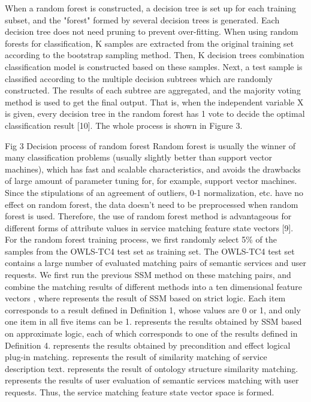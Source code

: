 \documentclass{ieeeaccess}
\begin{document}
When a random forest is constructed, a decision tree is set up for each training subset, and the "forest" formed by several decision trees is generated. Each decision tree does not need pruning to prevent over-fitting. When using random forests for classification, K samples are extracted from the original training set according to the bootstrap sampling method. Then, K decision trees combination classification model is constructed based on these samples. Next, a test sample is classified according to the multiple decision subtrees which are randomly constructed. The results of each subtree are aggregated, and the majority voting method is used to get the final output. That is, when the independent variable X is given, every decision tree in the random forest has 1 vote to decide the optimal classification result [10]. The whole process is shown in Figure 3.
 
Fig 3 Decision process of random forest
Random forest is usually the winner of many classification problems (usually slightly better than support vector machines), which has fast and scalable characteristics, and avoids the drawbacks of large amount of parameter tuning for, for example, support vector machines. Since the stipulations of an agreement of outliers, 0-1 normalization, etc. have no effect on random forest, the data doesn't need to be preprocessed when random forest is used. Therefore, the use of random forest method is advantageous for different forms of attribute values in service matching feature state vectors [9].
For the random forest training process, we first randomly select 5\% of the samples from the OWLS-TC4 test set as training set. The OWLS-TC4 test set contains a large number of evaluated matching pairs of semantic services and user requests. We first run the previous SSM method on these matching pairs, and combine the matching results of different methods into a ten dimensional feature vectors  , where   represents the result of SSM based on strict logic. Each item corresponds to a result defined in Definition 1, whose values are 0 or 1, and only one item in all five items can be 1.   represents the results obtained by SSM based on approximate logic, each of which corresponds to one of the results defined in Definition 4.   represents the results obtained by precondition and effect logical plug-in matching.   represents the result of similarity matching of service description text.   represents the result of ontology structure similarity matching.   represents the results of user evaluation of semantic services matching with user requests. Thus, the service matching feature state vector space   is formed.
\end{document}
